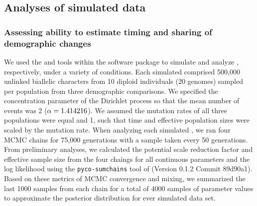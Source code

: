
\subsection{Analyses of simulated data}

\subsubsection{Assessing ability to estimate timing and sharing of demographic changes}

We used the \simcoevolity and \ecoevolity tools within the \ecoevolity software
package
\citep{Oaks2018ecoevolity}
to simulate and analyze \datasets, respectively, under a variety of conditions.
Each simulated \dataset comprised 500,000 unlinked biallelic characters from 10
diploid individuals (20 genomes) sampled per population from three demographic
comparisons.
We specified the concentration parameter of the Dirichlet process so that
the mean number of events was 2 ($\alpha = 1.414216$).
We assumed the mutation rates of all three populations were equal and 1, such
that time and effective population sizes were scaled by the mutation rate.
When analyzing each simulated \dataset, we ran four MCMC chains for 75,000
generations with a sample taken every 50 generations.
From preliminary analyses, we calculated the potential scale reduction factor
\citep[PSRF; the square root of Equation 1.1 in][]{Brooks1998} and effective
sample size \citep{Gong2014} from the four chaings for all continuous
parameters and the log likelihood using the \texttt{pyco-sumchains} tool of
\pycoevolity (Version 0.1.2 Commit 89d90a1).
Based on these metrics of MCMC convergence and mixing, we summarized the last
1000 samples from each chain for a total of 4000 samples of parameter values to
approximate the posterior distribution for ever simulated data set.

